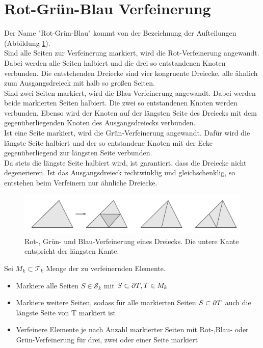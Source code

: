 \section{Rot-Grün-Blau Verfeinerung}
Der Name "Rot-Grün-Blau" kommt von der Bezeichnung der Aufteilungen (Abbildung \ref{dreieck}). \\ Sind alle Seiten zur Verfeinerung markiert, wird die Rot-Verfeinerung angewandt. Dabei werden alle Seiten halbiert und die drei so entstandenen Knoten verbunden. Die entstehenden Dreiecke sind vier kongruente Dreiecke, alle ähnlich zum Ausgangsdreieck mit halb so großen Seiten. \\ Sind zwei Seiten markiert, wird die Blau-Verfeinerung angewandt. Dabei werden beide markierten Seiten halbiert. Die zwei so entstandenen Knoten werden verbunden. Ebenso wird der Knoten auf der längsten Seite des Dreiecks mit dem gegenüberliegenden Knoten des Ausgangsdreiecks verbunden. \\
Ist eine Seite markiert, wird die Grün-Verfeinerung angewandt. Dafür wird die längste Seite halbiert und der so entstandene Knoten mit der Ecke gegenüberliegend zur längsten Seite verbunden. \\
Da stets die längste Seite halbiert wird, ist garantiert, dass die Dreiecke nicht degenerieren. Ist das Ausgangsdreieck rechtwinklig und gleichschenklig, so entstehen beim Verfeinern nur ähnliche Dreiecke.
\begin{figure}[!htbp]
	\begin{center}
		\includegraphics[width=16cm]{pics/redref.png}
	\end{center}
	\caption{\label{dreieck}Rot-, Grün- und Blau-Verfeinerung eines Dreiecks. Die untere Kante entspricht der längsten Kante.}
\end{figure}

\begin{algorithmus}
    Sei $M_k\subset \mathscr{T}_k$ Menge der zu verfeinernden Elemente.
	\begin{itemize}
		\item[(1)] Markiere alle Seiten $S \in \mathscr{S}_k$ mit $S \subset \partial T, T\in M_k$
		\item[(2)] Markiere weitere Seiten, sodass für alle markierten Seiten $S\subset \partial T$  auch die längste Seite von T markiert ist
		\item[(3)] Verfeinere Elemente je nach Anzahl markierter Seiten mit  Rot-,Blau- oder Grün-Verfeinerung für drei, zwei oder einer Seite markiert
	\end{itemize}
\end{algorithmus}

